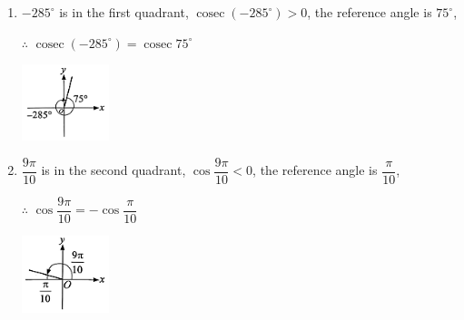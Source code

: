 \documentclass{report}
\begin{document}
\begin{question}
\begin{enumerate}[label=(\alph*)]
        \item \begin{multicols}{2}
            $-285^\circ$ is in the first quadrant, $\operatorname{cosec}(-285^\circ) > 0$, the reference angle is $75^\circ$,

            $\therefore$ $\operatorname{cosec}(-285^\circ) = \operatorname{cosec}75^\circ$

            \vfill\null
            \begin{center}
                \includegraphics[width=0.2\textwidth]{assets/9-11.jpg}
            \end{center}
        \end{multicols}

        \item \begin{multicols}{2}
            $\dfrac{9\pi}{10}$ is in the second quadrant, $\cos\dfrac{9\pi}{10} < 0$, the reference angle is $\dfrac{\pi}{10}$,

            $\therefore$ $\cos\dfrac{9\pi}{10} = -\cos\dfrac{\pi}{10}$

            \vfill\null
            \begin{center}
                \includegraphics[width=0.2\textwidth]{assets/9-12.jpg}
            \end{center}
        \end{multicols}
    \end{enumerate}
\end{question}
\end{document}
